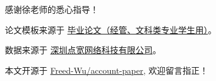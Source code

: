 \documentclass[../main]{subfiles}
\begin{document}
\begin{acknowledgement}

  感谢徐老师的悉心指导！

  论文模板来源于
  \href{http://bysj.njust.edu.cn/shownews.aspx?newsno=e4LiW2l+s2ooF8tSiaKc1Q....}{毕业论文（经管、文科类专业学生用）}。

  数据来源于
  \href{https://www.tipdm.org/bdrace/tzbstysj/20200228/1637.html}{深圳点宽网络科技有限公司}。

  本文开源于
  \href{https://github.com/Freed-Wu/account-paper}{Freed-Wu/account-paper},
  欢迎留言指正！
\end{acknowledgement}
\end{document}
